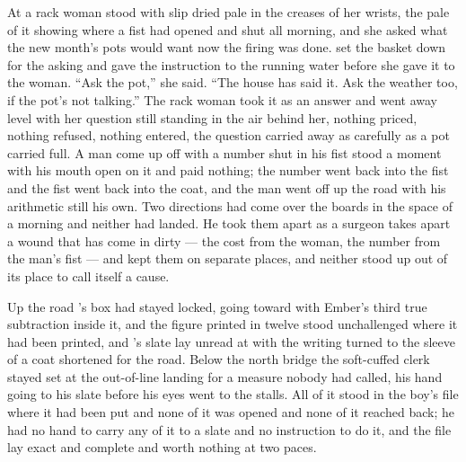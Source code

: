 At  a rack woman stood with slip dried pale in the creases of her wrists, the pale of it showing where a fist had opened and shut all morning, and she asked what the new month's pots would want now the firing was done.  set the basket down for the asking and gave the instruction to the running water before she gave it to the woman. “Ask the pot,” she said. “The house has said it. Ask the weather too, if the pot's not talking.” The rack woman took it as an answer and went away level with her question still standing in the air behind her, nothing priced, nothing refused, nothing entered, the question carried away as carefully as a pot carried full. A man come up off  with a number shut in his fist stood a moment with his mouth open on it and paid nothing; the number went back into the fist and the fist went back into the coat, and the man went off up the road with his arithmetic still his own. Two directions had come over the boards in the space of a morning and neither had landed. He took them apart as a surgeon takes apart a wound that has come in dirty --- the cost from the woman, the number from the man's fist --- and kept them on separate places, and neither stood up out of its place to call itself a cause.

Up the road 's box had stayed locked, going toward  with Ember's third true subtraction inside it, and the figure printed in twelve stood unchallenged where it had been printed, and 's slate lay unread at  with the writing turned to the sleeve of a coat shortened for the road. Below the north bridge the soft-cuffed clerk stayed set at the out-of-line landing for a measure nobody had called, his hand going to his slate before his eyes went to the stalls. All of it stood in the boy's file where it had been put and none of it was opened and none of it reached back; he had no hand to carry any of it to a slate and no instruction to do it, and the file lay exact and complete and worth nothing at two paces.

